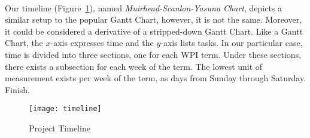 \paragraph{}
Our timeline (Figure~\ref{fig:project_timeline}), named \textit{Muirhead-Scanlon-Yasuna Chart}, depicts a similar setup to the popular Gantt Chart, however, it is not the same. Moreover, it could be considered a derivative of a stripped-down Gantt Chart. Like a Gantt Chart, the $x$-axis expresses time and the $y$-axis lists tasks. In our particular case, time is divided into three sections, one for each WPI term. Under these sections, there exists a subsection for each week of the term. The lowest unit of measurement exists per week of the term, as days from Sunday through Saturday. \TODO Finish.

\begin{figure}[h]
    \texttt{[image: timeline]}
    \caption{Project Timeline}
    \label{fig:project_timeline}
\end{figure}
